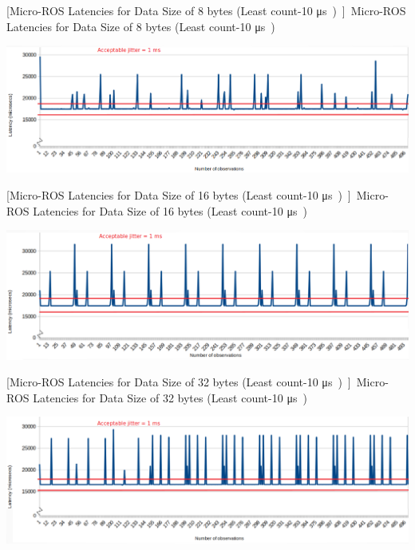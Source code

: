 \documentclass[%
xelatex,
	oneside,		%
	12pt,			%
	parskip=half,	%
	abstracton,
	chapterprefix=true%
    appendixprefix=true]
{scrbook}
\begin{document}
\begin{itemize}
\begin{center}
[Micro-ROS Latencies for Data Size of 8 bytes (Least count-10 \si\micro s)]{Micro-ROS Latencies for Data Size of 8 bytes (Least count-10 \si\micro s)}
\label{fig:uros8byte}
\end{center}


\begin{center}
\includegraphics[scale=0.34]{fig/uros16byte2.png}

[Micro-ROS Latencies for Data Size of 16 bytes (Least count-10 \si\micro s)]{Micro-ROS Latencies for Data Size of 16 bytes (Least count-10 \si\micro s)}
\label{fig:uros16byte}
\end{center}

\begin{center}
\includegraphics[scale=0.34]{fig/uros32byte2.png}

[Micro-ROS Latencies for Data Size of 32 bytes (Least count-10 \si\micro s)]{Micro-ROS Latencies for Data Size of 32 bytes (Least count-10 \si\micro s)}
\label{fig:uros32byte}
\end{center}

\begin{center}
\includegraphics[scale=0.34]{fig/uros64byte2.png}


\end{center}
\end{itemize}
\end{document}
